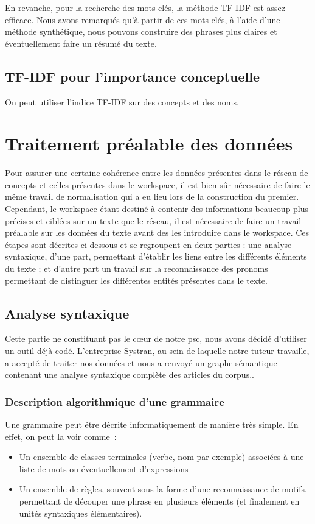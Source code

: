 \documentclass[a4paper, 12pt]{article}
\begin{document}
En revanche, pour la recherche des mots-clés, la méthode TF-IDF est assez efficace. Nous avons remarqués qu'à partir de ces mots-clés, à l'aide d'une méthode synthétique, nous pouvons construire des phrases plus claires et éventuellement faire un résumé du texte.

\subsection{TF-IDF pour l'importance conceptuelle}
On peut utiliser l'indice TF-IDF sur des concepts et des noms.



\section{Traitement préalable des données}

Pour assurer une certaine cohérence entre les données présentes dans le réseau de concepts et celles présentes dans le workspace, il est bien sûr nécessaire de faire le même travail de normalisation qui a eu lieu lors de la construction du premier. Cependant, le workspace étant destiné à contenir des informations beaucoup plus précises et ciblées sur un texte que le réseau, il est nécessaire de faire un travail préalable sur les données du texte avant des les introduire dans le workspace. Ces étapes sont décrites ci-dessous et se regroupent en deux parties : une analyse syntaxique, d'une part, permettant d'établir les liens entre les différents éléments du texte ; et d'autre part un travail sur la reconnaissance des pronoms permettant de distinguer les différentes entités présentes dans le texte.

\subsection{Analyse syntaxique}

Cette partie ne constituant pas le c\oe{}ur de notre psc, nous avons décidé d'utiliser un outil déjà codé. L'entreprise Systran, au sein de laquelle notre tuteur travaille, a accepté de traiter nos données et nous a renvoyé un graphe sémantique contenant une analyse syntaxique complète des articles du corpus..

\subsubsection{Description algorithmique d'une grammaire}
Une grammaire peut être décrite informatiquement de manière très simple. En effet, on peut la voir comme~:
\begin{itemize}
	\item Un ensemble de classes terminales (verbe, nom par exemple) associées à une liste de mots ou éventuellement d'expressions
	\item Un ensemble de règles, souvent sous la forme d'une reconnaissance de motifs, permettant de découper une phrase en plusieurs éléments (et finalement en unités syntaxiques élémentaires).
\end{itemize}
\end{document}
